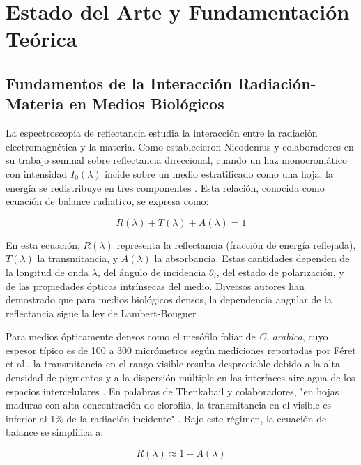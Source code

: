 \documentclass[12pt, a4paper]{article}
\begin{document}
	\section{Estado del Arte y Fundamentación Teórica}
	
	\subsection{Fundamentos de la Interacción Radiación-Materia en Medios Biológicos}
	
	La espectroscopía de reflectancia estudia la interacción entre la radiación electromagnética y la materia. Como establecieron Nicodemus y colaboradores en su trabajo seminal sobre reflectancia direccional, cuando un haz monocromático con intensidad $I_0(\lambda)$ incide sobre un medio estratificado como una hoja, la energía se redistribuye en tres componentes \parencite{Nicodemus1965}. Esta relación, conocida como ecuación de balance radiativo, se expresa como:
	
	\begin{equation}
		R(\lambda) + T(\lambda) + A(\lambda) = 1
		\label{eq:balance_energetico}
	\end{equation}
	
	En esta ecuación, $R(\lambda)$ representa la reflectancia (fracción de energía reflejada), $T(\lambda)$ la transmitancia, y $A(\lambda)$ la absorbancia. Estas cantidades dependen de la longitud de onda $\lambda$, del ángulo de incidencia $\theta_i$, del estado de polarización, y de las propiedades ópticas intrínsecas del medio. Diversos autores han demostrado que para medios biológicos densos, la dependencia angular de la reflectancia sigue la ley de Lambert-Bouguer \parencite{Hecht2017, Saleh2019}.
	
	Para medios ópticamente densos como el mesófilo foliar de \textit{C. arabica}, cuyo espesor típico es de 100 a 300 micrómetros según mediciones reportadas por Féret et al., la transmitancia en el rango visible resulta despreciable debido a la alta densidad de pigmentos y a la dispersión múltiple en las interfaces aire-agua de los espacios intercelulares \parencite{feret2008}. En palabras de Thenkabail y colaboradores, "en hojas maduras con alta concentración de clorofila, la transmitancia en el visible es inferior al 1\% de la radiación incidente" \parencite{Thenkabail2012}. Bajo este régimen, la ecuación de balance se simplifica a:
	
	\begin{equation}
		R(\lambda) \approx 1 - A(\lambda)
		\label{eq:reflectancia_aproximada}
	\end{equation}
	
\end{document}
